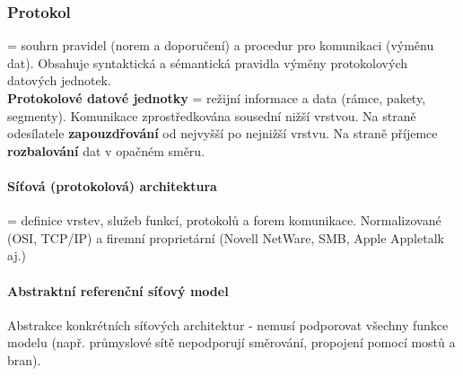 \documentclass[10pt,a4paper]{article}
\begin{document}
\subsubsection{Protokol}
= souhrn pravidel (norem a doporučení) a procedur pro komunikaci (výměnu dat). Obsahuje syntaktická a sémantická pravidla výměny protokolových datových jednotek.\\
\textbf{Protokolové datové jednotky} = režijní informace a data (rámce, pakety, segmenty). Komunikace zprostředkována sousední nižší vrstvou. Na straně odesílatele \textbf{zapouzdřování} od nejvyšší po nejnižší vrstvu. Na straně příjemce \textbf{rozbalování} dat v opačném směru.
\paragraph{Síťová (protokolová) architektura} = definice vrstev, služeb funkcí, protokolů a forem komunikace. Normalizované (OSI, TCP/IP) a firemní proprietární (Novell NetWare, SMB, Apple Appletalk aj.)
\paragraph{Abstraktní referenční síťový model} Abstrakce konkrétních síťových architektur - nemusí podporovat všechny funkce modelu (např. průmyslové sítě nepodporují směrování, propojení pomocí mostů a bran).
\end{document}
